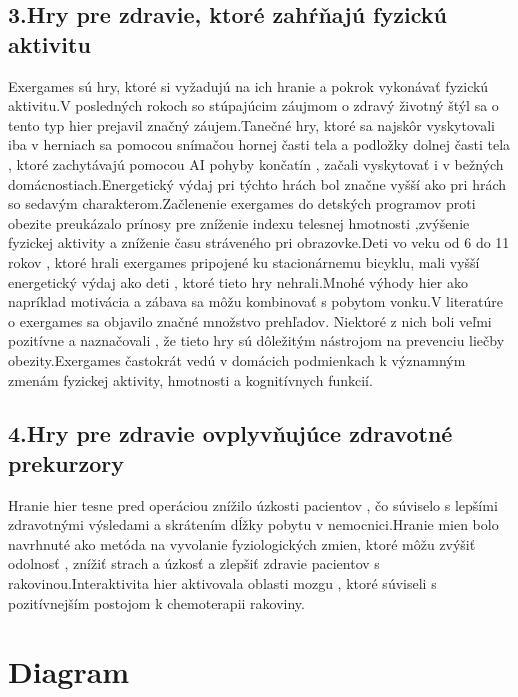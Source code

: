 \documentclass[10pt,oneside,slovak,a4paper]{article}
\begin{document}
\subsection{3.Hry pre zdravie, ktoré zahŕňajú fyzickú aktivitu}
Exergames sú hry, ktoré si vyžadujú na ich hranie a pokrok vykonávať fyzickú aktivitu.V posledných rokoch so stúpajúcim záujmom o zdravý životný štýl sa o tento typ hier prejavil značný záujem.Tanečné hry, ktoré sa najskôr vyskytovali iba v herniach sa pomocou snímačou hornej časti tela a podložky dolnej časti tela , ktoré zachytávajú pomocou AI pohyby končatín , začali vyskytovať i v bežných domácnostiach.Energetický výdaj pri týchto hrách bol značne vyšší ako pri hrách so sedavým charakterom.Začlenenie exergames do detských programov proti obezite preukázalo prínosy pre zníženie indexu telesnej hmotnosti ,zvýšenie fyzickej aktivity a zníženie času stráveného pri obrazovke.Deti vo veku od 6 do 11 rokov , ktoré hrali exergames pripojené ku stacionárnemu bicyklu, mali vyšší energetický výdaj ako deti , ktoré tieto hry nehrali.Mnohé výhody hier ako napríklad motivácia a zábava sa môžu kombinovať s pobytom vonku.V literatúre o exergames sa objavilo značné množstvo prehľadov. Niektoré z nich boli veľmi pozitívne a naznačovali , že tieto hry sú dôležitým nástrojom na prevenciu liečby obezity.Exergames častokrát vedú v domácich podmienkach k významným zmenám fyzickej aktivity, hmotnosti a kognitívnych funkcií.
\subsection{4.Hry pre zdravie ovplyvňujúce zdravotné prekurzory}
Hranie hier tesne pred operáciou znížilo úzkosti pacientov , čo súviselo s lepšími zdravotnými výsledami a skrátením dĺžky pobytu v nemocnici.Hranie mien bolo navrhnuté ako metóda na vyvolanie fyziologických zmien, ktoré môžu zvýšiť odolnosť , znížiť strach a úzkosť a zlepšiť zdravie pacientov s rakovinou.Interaktivita hier aktivovala oblasti mozgu , ktoré súviseli s pozitívnejším postojom k chemoterapii rakoviny.
\section{Diagram}

\end{document}
